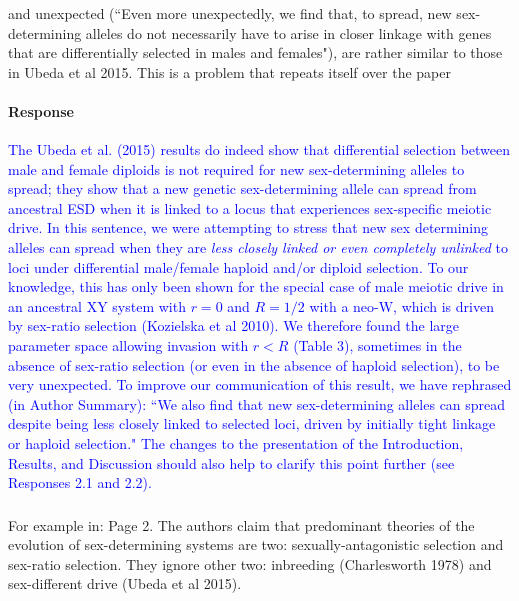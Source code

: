\documentclass[10pt,letterpaper]{article}
\begin{document}
\noindent\subsubsection{}
\noindent and unexpected (``Even more unexpectedly, we find that, to spread, new sex-determining alleles do not necessarily have to arise in closer linkage with genes that are differentially selected in males and females"), are rather similar to those in Ubeda et al 2015. This is a problem that repeats itself over the paper 

\noindent\paragraph{Response}
\textcolor{blue}{
The Ubeda et al. (2015) results do indeed show that differential selection between male and female diploids is not required for new sex-determining alleles to spread; they show that a new genetic sex-determining allele can spread from ancestral ESD when it is linked to a locus that experiences sex-specific meiotic drive. 
In this sentence, we were attempting to stress that new sex determining alleles can spread when they are \textit{less closely linked or even completely unlinked} to loci under differential male/female haploid and/or diploid selection. 
To our knowledge, this has only been shown for the special case of male meiotic drive in an ancestral XY system with $r=0$ and $R=1/2$ with a neo-W, which is driven by sex-ratio selection (Kozielska et al 2010). 
We therefore found the large parameter space allowing invasion with $r<R$ (Table 3), sometimes in the absence of sex-ratio selection (or even in the absence of haploid selection), to be very unexpected.
To improve our communication of this result, we have rephrased (in Author Summary): ``We also find that new sex-determining alleles can spread despite being less closely linked to selected loci, driven by initially tight linkage or haploid selection." 
The changes to the presentation of the Introduction, Results, and Discussion should also help to clarify this point further (see Responses 2.1 and 2.2). 
}

\noindent\subsubsection{}
For example in: Page 2. The authors claim that predominant theories of the evolution of sex-determining systems are two: sexually-antagonistic selection and sex-ratio selection. They ignore other two: inbreeding (Charlesworth 1978) and sex-different drive (Ubeda et al 2015). 
\end{document}
